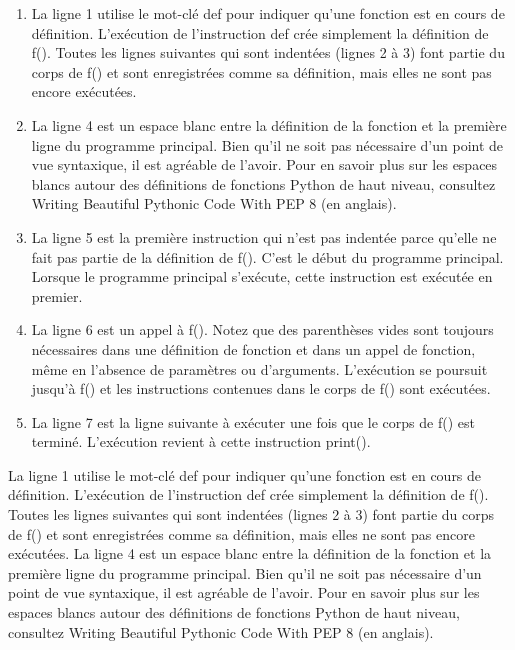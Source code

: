 \begin{enumerate}
\item 
La ligne 1 utilise le mot-clé def pour indiquer qu'une fonction est en cours de définition.  L'exécution de l'instruction def crée simplement la définition de f().  Toutes les lignes suivantes qui sont indentées (lignes 2 à 3) font partie du corps de f() et sont enregistrées comme sa définition, mais elles ne sont pas encore exécutées.

\item 
La ligne 4 est un espace blanc entre la définition de la fonction et la première ligne du programme principal. Bien qu'il ne soit pas nécessaire d'un point de vue syntaxique, il est agréable de l'avoir. Pour en savoir plus sur les espaces blancs autour des définitions de fonctions Python de haut niveau, consultez Writing Beautiful Pythonic Code With PEP 8 (en anglais).

\item 
La ligne 5 est la première instruction qui n'est pas indentée parce qu'elle ne fait pas partie de la définition de f(). C'est le début du programme principal.  Lorsque le programme principal s'exécute, cette instruction est exécutée en premier.

\item 
La ligne 6 est un appel à f(). Notez que des parenthèses vides sont toujours nécessaires dans une définition de fonction et dans un appel de fonction, même en l'absence de paramètres ou d'arguments. L'exécution se poursuit jusqu'à f() et les instructions contenues dans le corps de f() sont exécutées.

\item 
La ligne 7 est la ligne suivante à exécuter une fois que le corps de f() est terminé. L'exécution revient à cette instruction print().

\end{enumerate}
La ligne 1 utilise le mot-clé def pour indiquer qu'une fonction est en cours de définition.  L'exécution de l'instruction def crée simplement la définition de f().  Toutes les lignes suivantes qui sont indentées (lignes 2 à 3) font partie du corps de f() et sont enregistrées comme sa définition, mais elles ne sont pas encore exécutées.
La ligne 4 est un espace blanc entre la définition de la fonction et la première ligne du programme principal. Bien qu'il ne soit pas nécessaire d'un point de vue syntaxique, il est agréable de l'avoir. Pour en savoir plus sur les espaces blancs autour des définitions de fonctions Python de haut niveau, consultez Writing Beautiful Pythonic Code With PEP 8 (en anglais).
